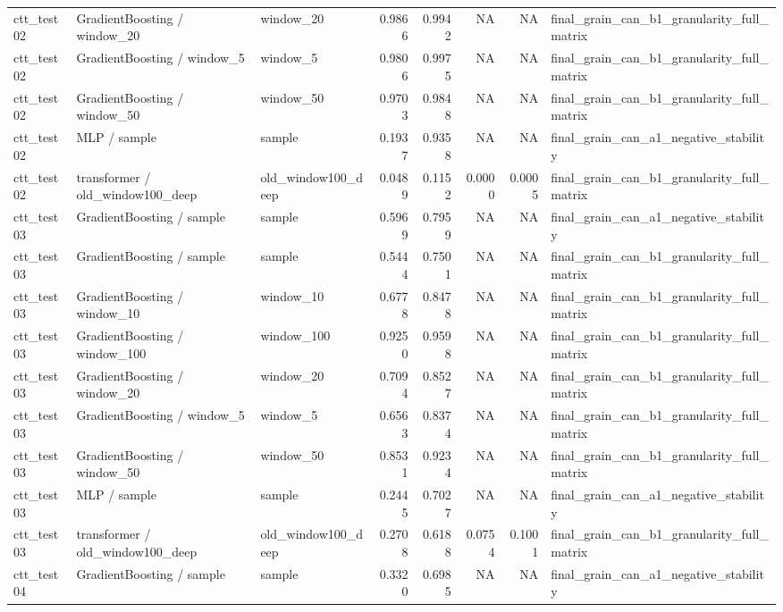 \begin{tabular}{lllrrrrl}
ctt\_test02 & GradientBoosting / window\_20 & window\_20 & 0.9866 & 0.9942 & NA & NA & final\_grain\_can\_b1\_granularity\_full\_matrix \\
ctt\_test02 & GradientBoosting / window\_5 & window\_5 & 0.9806 & 0.9975 & NA & NA & final\_grain\_can\_b1\_granularity\_full\_matrix \\
ctt\_test02 & GradientBoosting / window\_50 & window\_50 & 0.9703 & 0.9848 & NA & NA & final\_grain\_can\_b1\_granularity\_full\_matrix \\
ctt\_test02 & MLP / sample & sample & 0.1937 & 0.9358 & NA & NA & final\_grain\_can\_a1\_negative\_stability \\
ctt\_test02 & transformer / old\_window100\_deep & old\_window100\_deep & 0.0489 & 0.1152 & 0.0000 & 0.0005 & final\_grain\_can\_b1\_granularity\_full\_matrix \\
ctt\_test03 & GradientBoosting / sample & sample & 0.5969 & 0.7959 & NA & NA & final\_grain\_can\_a1\_negative\_stability \\
ctt\_test03 & GradientBoosting / sample & sample & 0.5444 & 0.7501 & NA & NA & final\_grain\_can\_b1\_granularity\_full\_matrix \\
ctt\_test03 & GradientBoosting / window\_10 & window\_10 & 0.6778 & 0.8478 & NA & NA & final\_grain\_can\_b1\_granularity\_full\_matrix \\
ctt\_test03 & GradientBoosting / window\_100 & window\_100 & 0.9250 & 0.9598 & NA & NA & final\_grain\_can\_b1\_granularity\_full\_matrix \\
ctt\_test03 & GradientBoosting / window\_20 & window\_20 & 0.7094 & 0.8527 & NA & NA & final\_grain\_can\_b1\_granularity\_full\_matrix \\
ctt\_test03 & GradientBoosting / window\_5 & window\_5 & 0.6563 & 0.8374 & NA & NA & final\_grain\_can\_b1\_granularity\_full\_matrix \\
ctt\_test03 & GradientBoosting / window\_50 & window\_50 & 0.8531 & 0.9234 & NA & NA & final\_grain\_can\_b1\_granularity\_full\_matrix \\
ctt\_test03 & MLP / sample & sample & 0.2445 & 0.7027 & NA & NA & final\_grain\_can\_a1\_negative\_stability \\
ctt\_test03 & transformer / old\_window100\_deep & old\_window100\_deep & 0.2708 & 0.6188 & 0.0754 & 0.1001 & final\_grain\_can\_b1\_granularity\_full\_matrix \\
ctt\_test04 & GradientBoosting / sample & sample & 0.3320 & 0.6985 & NA & NA & final\_grain\_can\_a1\_negative\_stability \\

\end{tabular}
